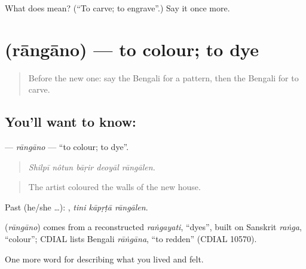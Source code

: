 \begin{tcolorbox}[breakable,colback=teal!4,colframe=teal!35!black,title={Before you move on}]
What does   mean? (\textquotedblleft{}To carve; to engrave\textquotedblright{}.) Say it once more.
\end{tcolorbox}
\section[\texorpdfstring{\bn{রাঙানো} (rāngāno)}{রাঙানো (rāngāno)}]{ (rāngāno) — to colour; to dye}

\label{lesson:BN-C524-rangano}



\begin{quote}
Before the new one: say the Bengali for a pattern, then the Bengali for to carve.
\end{quote}

\subsection*{You'll want to know: }
\textbf{} — \emph{rāngāno} — \textquotedblleft{}to colour; to dye\textquotedblright{}.

\begin{quote}
    
\end{quote}

\begin{quote}
\emph{Shilpī nôtun bāṛir deoyāl rāngālen.}
\end{quote}

\begin{quote}
The artist coloured the walls of the new house.
\end{quote}

Past (he/she …):   , \emph{tini kāpṛṭā rāngālen}.

\begin{cousinweb}
\textbf{} (\emph{rāngāno}) comes from a reconstructed \emph{raṅgayati}, \textquotedblleft{}dyes\textquotedblright{}, built on Sanskrit \emph{raṅga}, \textquotedblleft{}colour\textquotedblright{}; CDIAL lists Bengali \emph{rāṅgāna}, \textquotedblleft{}to redden\textquotedblright{} (CDIAL 10570).
\end{cousinweb}

\begin{grammarlens}[title={What you've built}]
One more word for describing what you lived and felt.
\end{grammarlens}

